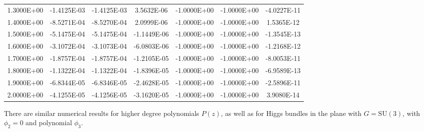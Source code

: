 \documentclass[12pt,letterpaper,reqno]{article}
\numberwithin{equation}{section}
\newcommand{\SU}{\mathrm{SU}}
\begin{document}
{\begin{tabular}{|c|c|c|c|c|c|c|}
 1.3000E+00     & -1.4125E-03     & -1.4125E-03     &  3.5632E-06     & -1.0000E+00     & -1.0000E+00     & -4.0227E-11    \\ 
 1.4000E+00     & -8.5271E-04     & -8.5270E-04     &  2.0999E-06     & -1.0000E+00     & -1.0000E+00     &  1.5365E-12    \\ 
 1.5000E+00     & -5.1475E-04     & -5.1475E-04     & -1.1449E-06     & -1.0000E+00     & -1.0000E+00     & -1.3545E-13    \\ 
 1.6000E+00     & -3.1072E-04     & -3.1073E-04     & -6.0803E-06     & -1.0000E+00     & -1.0000E+00     & -1.2168E-12    \\ 
 1.7000E+00     & -1.8757E-04     & -1.8757E-04     & -1.2105E-05     & -1.0000E+00     & -1.0000E+00     & -8.0053E-11    \\ 
 1.8000E+00     & -1.1322E-04     & -1.1322E-04     & -1.8396E-05     & -1.0000E+00     & -1.0000E+00     & -6.9589E-13    \\ 
 1.9000E+00     & -6.8344E-05     & -6.8346E-05     & -2.4628E-05     & -1.0000E+00     & -1.0000E+00     & -2.5896E-11    \\ 
 2.0000E+00     & -4.1255E-05     & -4.1256E-05     & -3.1620E-05     & -1.0000E+00     & -1.0000E+00     &  3.9080E-14    \\ 
\hline
\end{tabular}
}

\medskip

There are similar numerical results for higher
degree polynomials $P(z)$, as well as for Higgs bundles
in the plane with $G = \SU(3)$, with $\phi_2 = 0$
and polynomial $\phi_3$.

\printbibliography
\end{document}
